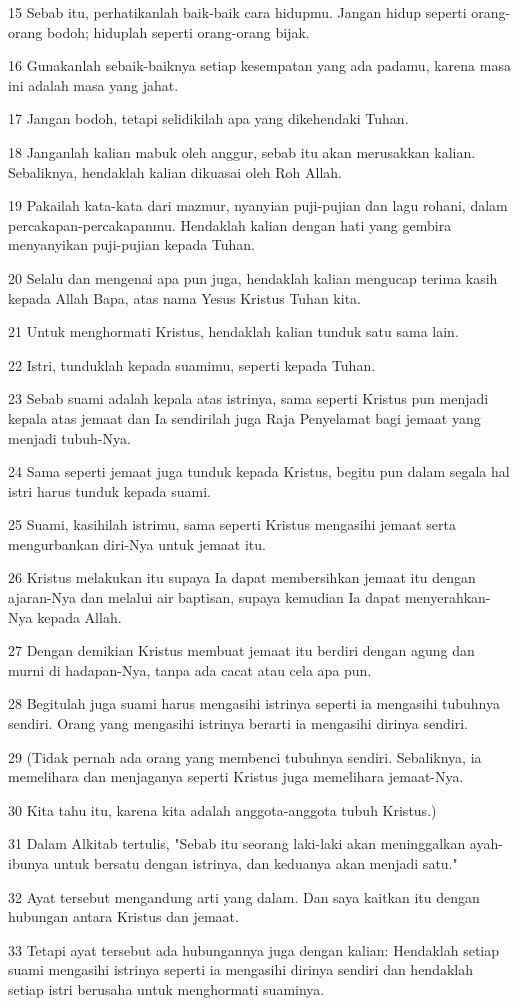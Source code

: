 \par 15 Sebab itu, perhatikanlah baik-baik cara hidupmu. Jangan hidup seperti orang-orang bodoh; hiduplah seperti orang-orang bijak.
\par 16 Gunakanlah sebaik-baiknya setiap kesempatan yang ada padamu, karena masa ini adalah masa yang jahat.
\par 17 Jangan bodoh, tetapi selidikilah apa yang dikehendaki Tuhan.
\par 18 Janganlah kalian mabuk oleh anggur, sebab itu akan merusakkan kalian. Sebaliknya, hendaklah kalian dikuasai oleh Roh Allah.
\par 19 Pakailah kata-kata dari mazmur, nyanyian puji-pujian dan lagu rohani, dalam percakapan-percakapanmu. Hendaklah kalian dengan hati yang gembira menyanyikan puji-pujian kepada Tuhan.
\par 20 Selalu dan mengenai apa pun juga, hendaklah kalian mengucap terima kasih kepada Allah Bapa, atas nama Yesus Kristus Tuhan kita.
\par 21 Untuk menghormati Kristus, hendaklah kalian tunduk satu sama lain.
\par 22 Istri, tunduklah kepada suamimu, seperti kepada Tuhan.
\par 23 Sebab suami adalah kepala atas istrinya, sama seperti Kristus pun menjadi kepala atas jemaat dan Ia sendirilah juga Raja Penyelamat bagi jemaat yang menjadi tubuh-Nya.
\par 24 Sama seperti jemaat juga tunduk kepada Kristus, begitu pun dalam segala hal istri harus tunduk kepada suami.
\par 25 Suami, kasihilah istrimu, sama seperti Kristus mengasihi jemaat serta mengurbankan diri-Nya untuk jemaat itu.
\par 26 Kristus melakukan itu supaya Ia dapat membersihkan jemaat itu dengan ajaran-Nya dan melalui air baptisan, supaya kemudian Ia dapat menyerahkan-Nya kepada Allah.
\par 27 Dengan demikian Kristus membuat jemaat itu berdiri dengan agung dan murni di hadapan-Nya, tanpa ada cacat atau cela apa pun.
\par 28 Begitulah juga suami harus mengasihi istrinya seperti ia mengasihi tubuhnya sendiri. Orang yang mengasihi istrinya berarti ia mengasihi dirinya sendiri.
\par 29 (Tidak pernah ada orang yang membenci tubuhnya sendiri. Sebaliknya, ia memelihara dan menjaganya seperti Kristus juga memelihara jemaat-Nya.
\par 30 Kita tahu itu, karena kita adalah anggota-anggota tubuh Kristus.)
\par 31 Dalam Alkitab tertulis, "Sebab itu seorang laki-laki akan meninggalkan ayah-ibunya untuk bersatu dengan istrinya, dan keduanya akan menjadi satu."
\par 32 Ayat tersebut mengandung arti yang dalam. Dan saya kaitkan itu dengan hubungan antara Kristus dan jemaat.
\par 33 Tetapi ayat tersebut ada hubungannya juga dengan kalian: Hendaklah setiap suami mengasihi istrinya seperti ia mengasihi dirinya sendiri dan hendaklah setiap istri berusaha untuk menghormati suaminya.

